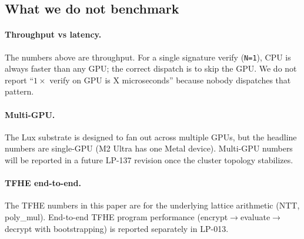 \subsection{What we do not benchmark}

\paragraph{Throughput vs latency.} The numbers above are throughput. For a single signature verify (\texttt{N=1}), CPU is always faster than any GPU; the correct dispatch is to skip the GPU. We do not report ``$1\times$ verify on GPU is X microseconds'' because nobody dispatches that pattern.

\paragraph{Multi-GPU.} The Lux substrate is designed to fan out across multiple GPUs, but the headline numbers are single-GPU (M2 Ultra has one Metal device). Multi-GPU numbers will be reported in a future LP-137 revision once the cluster topology stabilizes.

\paragraph{TFHE end-to-end.} The TFHE numbers in this paper are for the underlying lattice arithmetic (NTT, poly\_mul). End-to-end TFHE program performance (encrypt$\rightarrow$evaluate$\rightarrow$decrypt with bootstrapping) is reported separately in LP-013.
